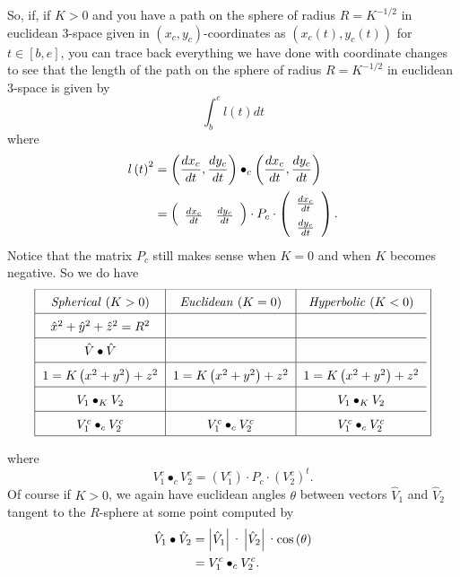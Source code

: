 \documentclass{ximera}
\begin{document}
So, if, if $K>0$ and you have a path on the sphere of radius $R=K^{-1/2}$ in
euclidean $3$-space given in $\left(  x_{c},y_{c}\right)  $-coordinates as
$\left(  x_{c}\left(  t\right)  ,y_{c}\left(  t\right)  \right)  $ for
$t\in\left[  b,e\right]  $, you can trace back everything we have done with
coordinate changes to see that the length of the path on the sphere of radius
$R=K^{-1/2}$ in euclidean $3$-space is given by%
\[%
{\displaystyle\int\nolimits_{b}^{e}}
l\left(  t\right)  dt
\]
where%
\begin{align*}
l\left(  t\right)  ^{2}  &  =\left(  \frac{dx_{c}}{dt},\frac{dy_{c}}%
{dt}\right)  \bullet_{c}\left(  \frac{dx_{c}}{dt},\frac{dy_{c}}{dt}\right) \\
&  =\left(
\begin{array}
[c]{cc}%
\frac{dx_{c}}{dt} & \frac{dy_{c}}{dt}%
\end{array}
\right)  \cdot P_{c}\cdot\left(
\begin{array}
[c]{c}%
\frac{dx_{c}}{dt}\\
\frac{dy_{c}}{dt}%
\end{array}
\right)  .
\end{align*}
Notice that the matrix $P_{c}$ still makes sense when $K=0$ and when $K$
becomes negative. So we do have%
\[{\renewcommand{\arraystretch}{1.6}
\frame{%
\begin{tabular}
[c]{c|c|c}%
\textit{Spherical} ($K>0$) & \textit{Euclidean} ($K=0$) & \textit{Hyperbolic}
($K<0$)\\\hline
$\hat{x}^{2}+\hat{y}^{2}+\hat{z}^{2}=R^{2}$ &  & \\ \hline
$\hat{V}\bullet\hat{V}$ &  & \\ \hline
$1=K\left(  x^{2}+y^{2}\right)  +z^{2}$ & $1=K\left(  x^{2}+y^{2}\right)
+z^{2}$ & $1=K\left(  x^{2}+y^{2}\right)  +z^{2}$\\ \hline
$V_{1}\bullet_{K}V_{2}$ &  & $V_{1}\bullet_{K}V_{2}$\\ \hline
$V_{1}^{c}\bullet_{c}V_{2}^{c}$ & $V_{1}^{c}\bullet_{c}V_{2}^{c}$ & $V_{1}%
^{c}\bullet_{c}V_{2}^{c}$%
\end{tabular}
}}
\]
where%
\[
V_{1}^{c}\bullet_{c}V_{2}^{c}=\left(  V_{1}^{c}\right)  \cdot P_{c}%
\cdot\left(  V_{2}^{c}\right)  ^{t}.
\]
Of course if $K>0$, we again have euclidean angles $\theta$ between vectors
$\hat{V}_{1}$ and $\hat{V}_{2}$ tangent to the $R$-sphere at some point
computed by%
\begin{align*}
\hat{V}_{1}\bullet\hat{V}_{2}  &  =\left\vert \hat{V}_{1}\right\vert
\text{\textperiodcentered}\left\vert \hat{V}_{2}\right\vert
\text{\textperiodcentered\textrm{cos}}\left(  \theta\right) \\
&  =V_{1}^{c}\bullet_{c}V_{2}^{c}.
\end{align*}
\end{document}
